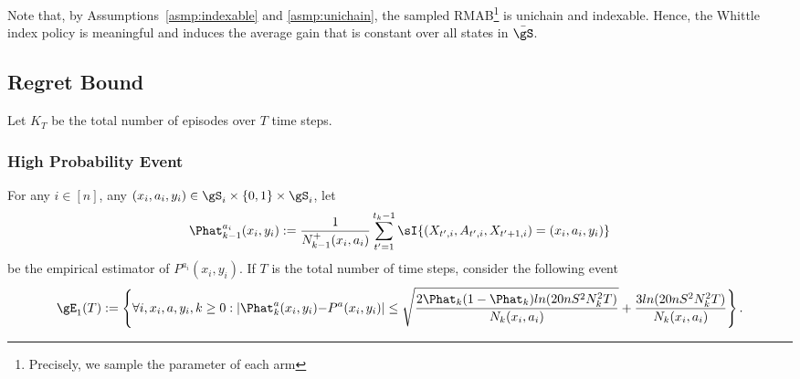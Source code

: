 Note that, by Assumptions~\ref{asmp:indexable} and \ref{asmp:unichain}, the sampled RMAB\footnote{Precisely, we sample the parameter of each arm} is unichain and indexable.
Hence, the Whittle index policy is meaningful and induces the average gain that is constant over all states in $\bar{\gS}$.

\subsection{Regret Bound}
\label{ssec:regret_bound}

Let $K_T$ be the total number of episodes over $T$ time steps.

\subsubsection{High Probability Event}
\label{sssec:high_event}

For any $i\in[n]$, any $(x_i,a_i,y_i)\in\gS_i\times\{0,1\}\times\gS_i$, let $${\Phat_{k-1}^{a_i}(x_i,y_i):=\frac1{N^+_{k-1}(x_i,a_i)}\sum_{t'=1}^{t_k-1}\sI{(X_{t',i},A_{t',i},X_{t'+1,i})=(x_i,a_i,y_i)}}$$ be the empirical estimator of $P^{a_i}(x_i,y_i)$.%
If $T$ is the total number of time steps, consider the following event
\begin{align}
    \gE_1(T):=\left\{\forall i,x_i,a,y_i,k\ge0: |\Phat_k^a(x_i,y_i) {-}P^a(x_i,y_i)|\le \sqrt{\frac{2\Phat_k(1-\Phat_k)ln(20nS^2N_k^2T)}{N_k(x_i,a_i)}} +\frac{3ln(20nS^2N_k^2T)}{N_k(x_i,a_i)}\right\}. \label{eq:event_1}
\end{align}

